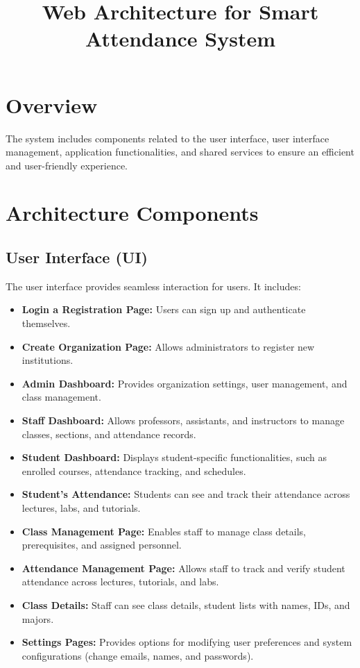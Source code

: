 \documentclass{article}
\title{Web Architecture for Smart Attendance System}
\author{}
\date{}
\begin{document}
\maketitle

\section{Overview}
The system includes components related to the user interface, user interface management, application functionalities, and shared services to ensure an efficient and user-friendly experience.

\section{Architecture Components}

\subsection{User Interface (UI)}
The user interface provides seamless interaction for users. It includes:
\begin{itemize}
    \item \textbf{Login a Registration Page:} Users can sign up and authenticate themselves.
    \item \textbf{Create Organization Page:} Allows administrators to register new institutions.
    \item \textbf{Admin Dashboard:} Provides organization settings, user management, and class management.
    \item \textbf{Staff Dashboard:} Allows professors, assistants, and instructors to manage classes, sections, and attendance records.
    \item \textbf{Student Dashboard:} Displays student-specific functionalities, such as enrolled courses, attendance tracking, and schedules.
    \item \textbf{Student’s Attendance:} Students can see and track their attendance across lectures, labs, and tutorials.
    \item \textbf{Class Management Page:} Enables staff to manage class details, prerequisites, and assigned personnel.
    \item \textbf{Attendance Management Page:} Allows staff to track and verify student attendance across lectures, tutorials, and labs.
    \item \textbf{Class Details:} Staff can see class details, student lists with names, IDs, and majors.
    \item \textbf{Settings Pages:} Provides options for modifying user preferences and system configurations (change emails, names, and passwords).
\end{itemize}
\end{document}
